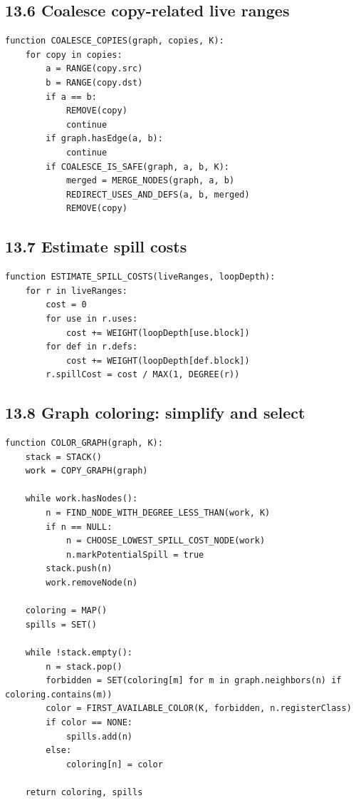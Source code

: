 \documentclass[10pt,letterpaper]{article}
\begin{document}
\subsection*{13.6 Coalesce copy-related live ranges}
{}

\begin{verbatim}
function COALESCE_COPIES(graph, copies, K):
    for copy in copies:
        a = RANGE(copy.src)
        b = RANGE(copy.dst)
        if a == b:
            REMOVE(copy)
            continue
        if graph.hasEdge(a, b):
            continue
        if COALESCE_IS_SAFE(graph, a, b, K):
            merged = MERGE_NODES(graph, a, b)
            REDIRECT_USES_AND_DEFS(a, b, merged)
            REMOVE(copy)
\end{verbatim}

\subsection*{13.7 Estimate spill costs}
{}

\begin{verbatim}
function ESTIMATE_SPILL_COSTS(liveRanges, loopDepth):
    for r in liveRanges:
        cost = 0
        for use in r.uses:
            cost += WEIGHT(loopDepth[use.block])
        for def in r.defs:
            cost += WEIGHT(loopDepth[def.block])
        r.spillCost = cost / MAX(1, DEGREE(r))
\end{verbatim}

\subsection*{13.8 Graph coloring: simplify and select}
{}

\begin{verbatim}
function COLOR_GRAPH(graph, K):
    stack = STACK()
    work = COPY_GRAPH(graph)

    while work.hasNodes():
        n = FIND_NODE_WITH_DEGREE_LESS_THAN(work, K)
        if n == NULL:
            n = CHOOSE_LOWEST_SPILL_COST_NODE(work)
            n.markPotentialSpill = true
        stack.push(n)
        work.removeNode(n)

    coloring = MAP()
    spills = SET()

    while !stack.empty():
        n = stack.pop()
        forbidden = SET(coloring[m] for m in graph.neighbors(n) if coloring.contains(m))
        color = FIRST_AVAILABLE_COLOR(K, forbidden, n.registerClass)
        if color == NONE:
            spills.add(n)
        else:
            coloring[n] = color

    return coloring, spills
\end{verbatim}
\end{document}

